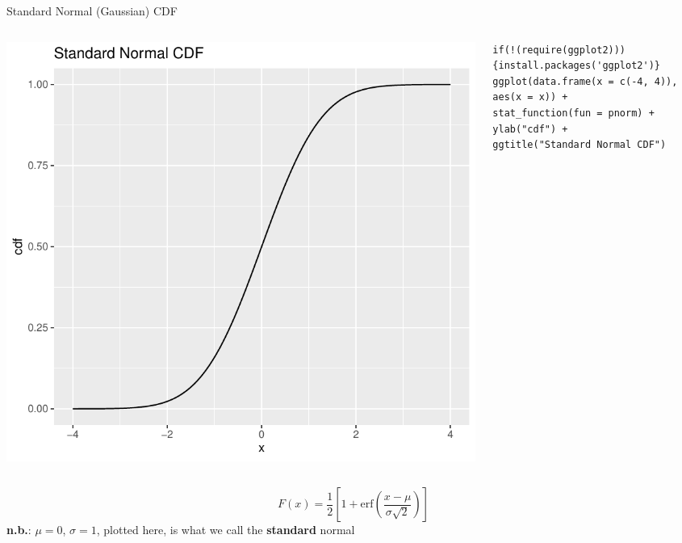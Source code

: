 \documentclass[aspectratio=169,11pt]{beamer}
\begin{document}
\begin{frame}[fragile]{Standard Normal (Gaussian) CDF}
\begin{columns}
\begin{column}{0.5\textwidth}
\begin{center}
\includegraphics[height=.5\textheight]{normal-cdf} 
\end{center}
\end{column}
\begin{column}{0.5\textwidth} 
\begin{lstlisting}
if(!(require(ggplot2))){install.packages('ggplot2')}
ggplot(data.frame(x = c(-4, 4)), aes(x = x)) +
stat_function(fun = pnorm) +
ylab("cdf") +
ggtitle("Standard Normal CDF") 
\end{lstlisting}
\end{column}
\end{columns}
\[
F\left(x\right) = \frac{1}{2} \left[ 1 + \text{erf}\left(\frac{x-\mu}{\sigma \sqrt{2}} \right)\right]
\]
{\bf n.b.}: $\mu=0$, $\sigma=1$, plotted here, is what we call the {\bf standard} normal
\end{frame}
\end{document}
